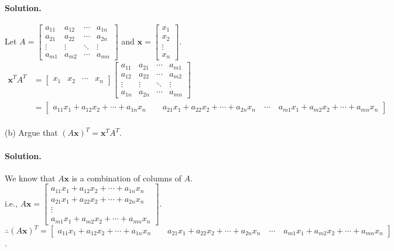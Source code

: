 \paragraph{Solution.}
Let $A = \begin{bmatrix}
    a_{11} & a_{12} & \cdots & a_{1n}\\
    a_{21} & a_{22} & \cdots & a_{2n}\\
    \vdots & \vdots & \ddots & \vdots\\
    a_{m1} & a_{m2} & \cdots & a_{mn}
\end{bmatrix}$ and $\mathbf{x} = \begin{bmatrix}
    x_1\\x_2\\\vdots\\x_n
\end{bmatrix}$.
\begin{align*}
    \mathbf{x}^TA^T &= \begin{bmatrix}
        x_1&x_2&\cdots&x_n
    \end{bmatrix}\begin{bmatrix}
        a_{11} & a_{21} & \cdots & a_{m1}\\
        a_{12} & a_{22} & \cdots & a_{m2}\\
        \vdots & \vdots & \ddots & \vdots\\
        a_{1n} & a_{2n} & \cdots & a_{mn}
    \end{bmatrix}\\
    &= \begin{bmatrix}
        a_{11}x_1 + a_{12}x_2 + \cdots + a_{1n}x_n\quad\quad
        a_{21}x_1 + a_{22}x_2 + \cdots + a_{2n}x_n\quad
        \cdots\quad
        a_{m1}x_1 + a_{m2}x_2 + \cdots + a_{mn}x_n
    \end{bmatrix}
\end{align*}\\

(b) Argue that $(A\mathbf{x})^T = \mathbf{x}^T A^T$.
\paragraph{Solution.}
We know that $A\mathbf{x}$ is a combination of columns of $A$.\\

i.e., $A\mathbf{x} = \begin{bmatrix}
    a_{11}x_1 + a_{12}x_2 + \cdots + a_{1n}x_n\\
    a_{21}x_1 + a_{22}x_2 + \cdots + a_{2n}x_n\\
    \vdots\\
    a_{m1}x_1 + a_{m2}x_2 + \cdots + a_{mn}x_n
\end{bmatrix}$.\\
$\therefore(A\mathbf{x})^T = \begin{bmatrix}
    a_{11}x_1 + a_{12}x_2 + \cdots + a_{1n}x_n\quad\quad
    a_{21}x_1 + a_{22}x_2 + \cdots + a_{2n}x_n\quad
    \cdots\quad
    a_{m1}x_1 + a_{m2}x_2 + \cdots + a_{mn}x_n
\end{bmatrix}$.\\

